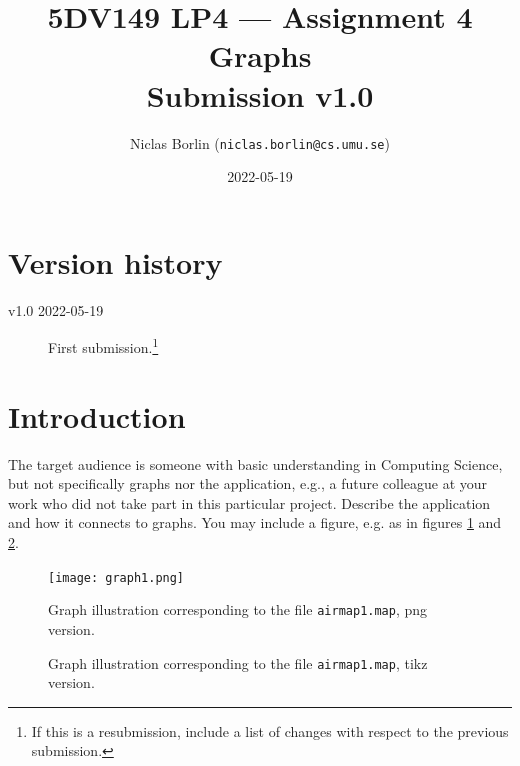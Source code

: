\documentclass{article}
\author{Niclas Borlin (\texttt{niclas.borlin@cs.umu.se})}
\date{2022-05-19}
\title{5DV149 LP4 --- Assignment 4\\\medskip
\large Graphs\\
Submission v1.0}
\begin{document}
\maketitle
\clearpage \tableofcontents \clearpage\addtocounter{section}{-1}
\section{Version history}
\label{sec:history}
\begin{description}
\item[{v1.0 2022-05-19}] First submission.\footnote{If this is a resubmission, include a list of changes with
respect to the previous submission.}
\end{description}

\section{Introduction}
\label{sec:intro}
The target audience is someone with basic understanding in Computing
Science, but not specifically graphs nor the application, e.g., a
future colleague at your work who did not take part in this particular
project. Describe the application and how it connects to graphs. You
may include a figure, e.g. as in figures \ref{fig:graph1} and \ref{fig:graph2}.

\begin{figure}[tbp]
\centering
\texttt{[image: graph1.png]}
\caption{\label{fig:graph1}Graph illustration corresponding to the file \texttt{airmap1.map}, png version.}
\end{figure}

\begin{figure}
  \begin{center}
  \end{center}
\caption{\label{fig:graph2}Graph illustration corresponding to the file \texttt{airmap1.map}, tikz version.}
\end{figure}
\end{document}
